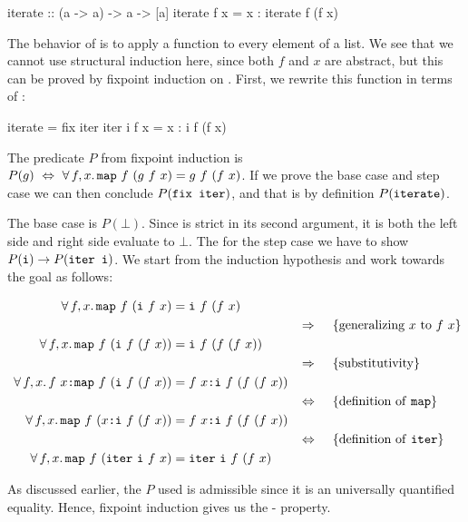 \begin{code}
iterate :: (a -> a) -> a -> [a]
iterate f x = x : iterate f (f x)
\end{code}

The behavior of  is to apply a function to every element of a
list. We see that we cannot use structural induction here, since both
$f$ and $x$ are abstract, but this can be proved by fixpoint induction
on . First, we rewrite this function in terms of :

\begin{code}
iterate = fix iter
iter i f x = x : i f (f x)
\end{code}

The predicate $P$ from fixpoint induction is $P(g) \w \Leftrightarrow
\w \faa{f}{x} \hs{map} \w f \w (g \w f \w x) \eq g \w f \w (f \w x) $. If we
prove the base case and step case we can then conclude
$P(\hs{fix iter})$, and that is by definition $P(\hs{iterate})$.

The base case is $P(\bot)$. Since  is strict in its second
argument, it is both the left side and right side evaluate to $\bot$.
The for the step case we have to show
$P(\hs{i}) \rightarrow P(\hs{iter i})$. We start from the induction
hypothesis and work towards the goal as follows:

\begin{align*}
\w \faa{f}{x} \hs{map} \w f \w (\hs{i} \w f \w x) & \eq \hs{i} \w f \w (f \w x) \\
\descra{generalizing $x$ to $f \w x$} \\
\w \faa{f}{x} \hs{map} \w f \w (\hs{i} \w f \w (f \w x)) & \eq \hs{i} \w f \w (f \w (f \w x)) \\
\descra{substitutivity} \\
\w \faa{f}{x} f \w x \hs{:} \hs{map} \w f \w (\hs{i} \w f \w (f \w x)) & \eq f \w x \hs{:} \hs{i} \w f \w (f \w (f \w x)) \\
\desclra{\defof{\texttt{map}}} \\
\w \faa{f}{x} \hs{map} \w f \w (x \hs{:} \hs{i} \w f \w (f \w x)) & \eq f \w x \hs{:} \hs{i} \w f \w (f \w (f \w x)) \\
\desclra{\defof{\texttt{iter}}} \\
\w \faa{f}{x} \hs{map} \w f \w (\hs{iter} \w \hs{i} \w f \w x) & \eq \hs{iter} \w \hs{i} \w f \w (f \w x) \\
\end{align*}

As discussed earlier, the $P$ used is admissible since it is an
universally quantified equality. Hence, fixpoint induction gives us the
- property.



